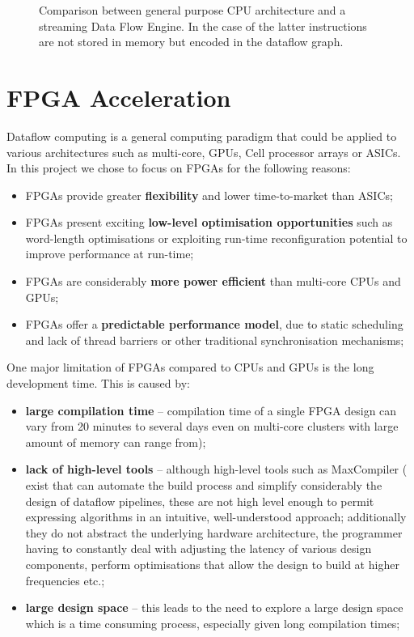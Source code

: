 \begin{figure}[!ht]
\vspace{-2cm}
  \centering
  \def\svgwidth{\textwidth}
  
\vspace{-2cm}
  \caption{Comparison between general purpose CPU architecture and a
    streaming Data Flow Engine. In the case of the latter instructions are
    not stored in memory but encoded in the dataflow graph. }
  \label{fig:cpudfe}
\end{figure}


\section{FPGA Acceleration}

Dataflow computing is a general computing paradigm that could be
applied to various architectures such as multi-core, GPUs, Cell
processor arrays or ASICs. In this project we chose to focus on FPGAs
for the following reasons:
\begin{itemize}
\item FPGAs provide greater \textbf{flexibility} and lower time-to-market than
  ASICs;
\item FPGAs present exciting \textbf{low-level optimisation opportunities} such
  as word-length optimisations or exploiting run-time reconfiguration
  potential to improve performance at run-time;
\item FPGAs are considerably \textbf{more power efficient} than multi-core CPUs
  and GPUs;
\item FPGAs offer a \textbf{predictable performance model}, due to static
  scheduling and lack of thread barriers or other traditional
  synchronisation mechanisms;
\end{itemize}

One major limitation of FPGAs compared to CPUs and GPUs is the long
development time. This is caused by:
\begin{itemize}
\item \textbf{large compilation time} -- compilation time of a single FPGA
  design can vary from 20 minutes to several days even on multi-core
  clusters with large amount of memory can range from);
\item \textbf{lack of high-level tools} -- although high-level tools such
  as MaxCompiler ( exist that can automate
  the build process and simplify considerably the design of dataflow
  pipelines, these are not high level enough to permit expressing
  algorithms in an intuitive, well-understood approach; additionally
  they do not abstract the underlying hardware architecture, the
  programmer having to constantly deal with adjusting the latency of
  various design components, perform optimisations that allow the
  design to build at higher frequencies etc.;
\item \textbf{large design space} -- this leads to the need to explore a
  large design space which is a time consuming process, especially
  given long compilation times;
\end{itemize}

